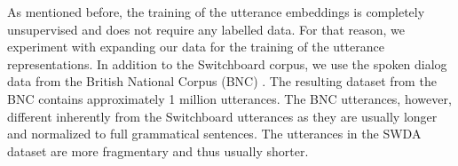 As mentioned before, the training of the utterance embeddings is completely unsupervised and does not require any labelled data.
For that reason, we experiment with expanding our data for the training of the utterance representations.
In addition to the Switchboard corpus, we use the spoken dialog data from the British National Corpus (BNC) .
The resulting dataset from the BNC contains approximately 1 million utterances. 
The BNC utterances, however, different inherently from the Switchboard utterances as they are usually longer and normalized to full grammatical sentences.
The utterances in the SWDA dataset are more fragmentary and thus usually shorter.





